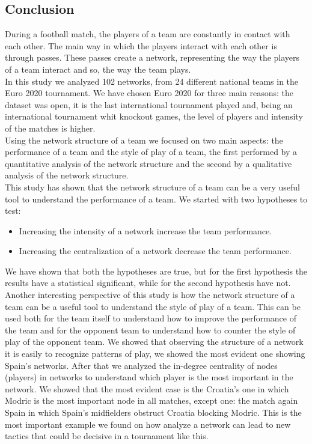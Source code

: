 \documentclass[12pt, a4paper]{article}
\begin{document}
\subsection{Conclusion}
\label{conclusion}
During a football match, the players of a team are constantly in contact with each other. The main way in which the players interact with each other is through passes. These passes create a network, representing the way the players of a team interact and so, the way the team plays.\\
In this study we analyzed 102 networks, from 24 different national teams in the Euro 2020 tournament. We have chosen Euro 2020 for three main reasons: the dataset was open, it is the last international tournament played and, being an international tournament whit knockout games, the level of players and intensity of the matches is higher.\\
Using the network structure of a team we focused on two main aspects: the performance of a team and the style of play of a team, the first performed by a quantitative analysis of the network structure and the second by a qualitative analysis of the network structure.\\
This study has shown that the network structure of a team can be a very useful tool to understand the performance of a team. We started with two hypotheses to test:
\begin{itemize}
        \item Increasing the intensity of a network increase the team performance.
        \item Increasing the centralization of a network decrease the team performance. 
\end{itemize}
We have shown that both the hypotheses are true, but for the first hypothesis the results have a statistical significant, while for the second hypothesis have not.\\
Another interesting perspective of this study is how the network structure of a team can be a useful tool to understand the style of play of a team. This can be used both for the team itself to understand how to improve the performance of the team and for the opponent team to understand how to counter the style of play of the opponent team. We showed that observing the structure of a network it is easily to recognize patterns of play, we showed the most evident one showing Spain's networks. After that we analyzed the in-degree centrality of nodes (players) in networks 
to understand which player is the most important in the network. We showed that the most evident case is the Croatia's one in which Modric is the most important node in all matches, except one: the match again Spain in which Spain's midfielders obstruct Croatia blocking Modric. This is the most important example we found on how analyze a network can lead to new tactics that could be decisive in a tournament like this. \\
\end{document}
